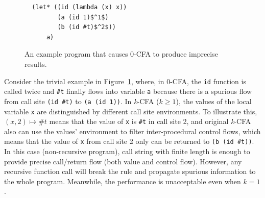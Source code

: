 \documentclass{article}
\begin{document}
\begin{figure}
\begin{lstlisting}
  (let* ((id (lambda (x) x))
         (a (id 1)$^1$)
         (b (id #t)$^2$))
      a)
\end{lstlisting}
\caption{An example program that causes 0-CFA to produce imprecise results.}
\label{fig:eg1}
\end{figure}

Consider the trivial example in Figure~\ref{fig:eg1}, where, in 0-CFA, the \verb|id| function is called twice and \verb|#t| finally flows into variable \verb|a| because there is a spurious flow from call site \verb|(id #t)| to \verb|(a (id 1))|.
In \textit{k}-CFA ($k \geq 1$), the values of the local variable \verb|x| are distinguished by different call site environments.
To illustrate this, $(x, 2) \mapsto \#t$ means that the value of \verb|x| is \verb|#t| in call site 2, and original \textit{k}-CFA also can use the values' environment to filter inter-procedural control flows, which means that the value of \verb|x| from call site 2 only can be returned to \verb|(b (id #t))|.
In this case (non-recursive program), call string with finite length is enough to provide precise call/return flow (both value and control flow).
However, any recursive function call will break the rule and propagate spurious information to the whole program.
Meanwhile, the performance is unacceptable even when $k = 1$.
\end{document}
